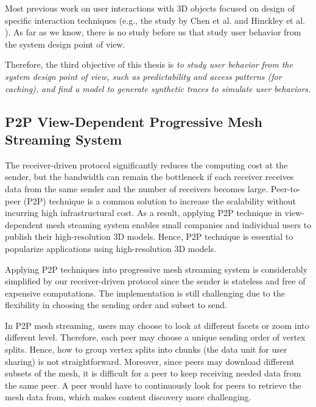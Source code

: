     Most previous work on user interactions with 3D objects focused on design
    of specific interaction techniques (e.g., the study by Chen et al. \cite{chen88study}
    and Hinckley et al. \cite{hinckley97usability}). 
    As far as we know, there is no study before us that study user behavior
    from the system design point of view.
    
    Therefore, the third objective of this thesis is 
    \textit{
            to study user behavior from the system design point of view, 
            such as predictability and access patterns (for caching), and
            find a model to generate synthetic traces to simulate user behaviors.
            }

    \subsection{P2P View-Dependent Progressive Mesh Streaming System}
    The receiver-driven protocol significantly reduces the computing cost at the sender,
    but the bandwidth can remain the bottleneck if each receiver receives data
    from the same sender and the number of receivers becomes large. 
    Peer-to-peer (P2P) technique is a common solution to increase
    the scalability without incurring high infrastructural cost. 
    As a result, applying P2P technique in view-dependent mesh steaming
    system enables small companies and individual users to publish
    their high-resolution 3D models. Hence, P2P technique is essential
    to popularize applications using high-resolution 3D models.
    
    Applying P2P techniques into progressive mesh streaming system
    is considerably simplified by our receiver-driven protocol since 
    the sender is stateless and free of expensive computations.
    The implementation is still challenging due to the flexibility
    in choosing the sending order and subset to send.
    
    In P2P mesh streaming, users 
    may choose to look at different facets or zoom into different level.
    Therefore, each peer may choose a unique sending order of
    vertex splits. Hence, how to group vertex splits into chunks (the data unit
    for user sharing) is not straightforward. 
    Moreover, since peers may download different subsets of the
    mesh, it is difficult for a peer to keep receiving
    needed data from the same peer.  
    A peer would have to continuously look for peers to retrieve the mesh data from, 
    which makes content discovery more challenging.

